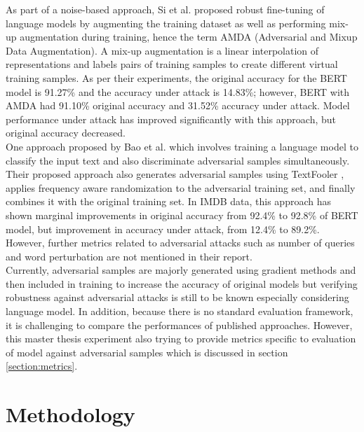 \documentclass[%
	BCOR=8mm, %
	DIV=12,
	toc=bibliography, %
	toc=listof, %
	oneside, %
	egregdoesnotlikesansseriftitles, %
	]{scrbook}
\begin{document}
As part of a noise-based approach, Si et al. \cite{si_better_2021}  proposed robust fine-tuning of language models by augmenting the training dataset as well as performing mix-up augmentation during training, hence the term AMDA (Adversarial and Mixup Data Augmentation). A mix-up augmentation is a linear interpolation of representations and labels pairs of training samples to create different virtual training samples. As per their experiments, the original accuracy for the BERT model is 91.27\% and the accuracy under attack is 14.83\%; however, BERT with AMDA had 91.10\% original accuracy and 31.52\% accuracy under attack. Model performance under attack has improved significantly with this approach, but original accuracy decreased.\\
One approach proposed by Bao et al. \cite{bao_defending_2021} which involves training a language model to classify the input text and also discriminate adversarial samples simultaneously. Their proposed approach also generates adversarial samples using TextFooler \cite{jin_is_2020}, applies frequency aware randomization to the adversarial training set, and finally combines it with the original training set. In IMDB data, this approach has shown marginal improvements in original accuracy from 92.4\% to 92.8\% of BERT model, but improvement in accuracy under attack, from 12.4\% to 89.2\%. However, further metrics related to adversarial attacks such as number of queries and word perturbation are not mentioned in their report.\\
Currently, adversarial samples are majorly generated using gradient methods and then included in training to increase the accuracy of original models but verifying robustness against adversarial attacks is still to be known especially considering language model. In addition, because there is no standard evaluation framework, it is challenging to compare the performances of published approaches. However, this master thesis experiment also trying to provide metrics specific to evaluation of model against adversarial samples which is discussed in section \ref{section:metrics}.

\chapter{ Methodology}
\label{chapter:methodology}
\end{document}

